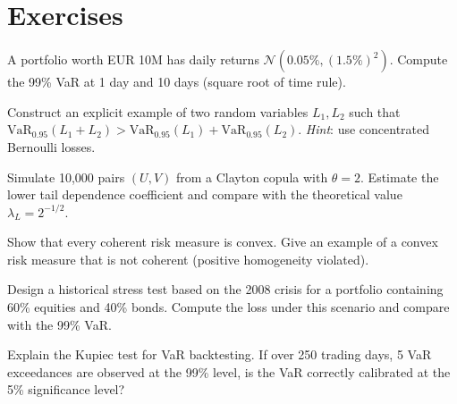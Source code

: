 \section{Exercises}

\begin{exercise}
A portfolio worth EUR 10M has daily returns
$\mathcal{N}(0.05\%, (1.5\%)^2)$. Compute the 99\% VaR at 1 day and 10 days
(square root of time rule).
\end{exercise}

\begin{exercise}
Construct an explicit example of two random variables $L_1, L_2$ such that
$\mathrm{VaR}_{0.95}(L_1 + L_2) > \mathrm{VaR}_{0.95}(L_1) +
\mathrm{VaR}_{0.95}(L_2)$.
\textit{Hint}: use concentrated Bernoulli losses.
\end{exercise}

\begin{exercise}
Simulate 10,000 pairs $(U, V)$ from a Clayton copula with $\theta = 2$.
Estimate the lower tail dependence coefficient and compare with the
theoretical value $\lambda_L = 2^{-1/2}$.
\end{exercise}

\begin{exercise}
Show that every coherent risk measure is convex. Give an example of a convex
risk measure that is not coherent (positive homogeneity violated).
\end{exercise}

\begin{exercise}
Design a historical stress test based on the 2008 crisis for a portfolio
containing 60\% equities and 40\% bonds. Compute the loss under this scenario
and compare with the 99\% VaR.
\end{exercise}

\begin{exercise}[Backtesting]
Explain the Kupiec test for VaR backtesting. If over 250 trading days, 5 VaR
exceedances are observed at the 99\% level, is the VaR correctly calibrated
at the 5\% significance level?
\end{exercise}
